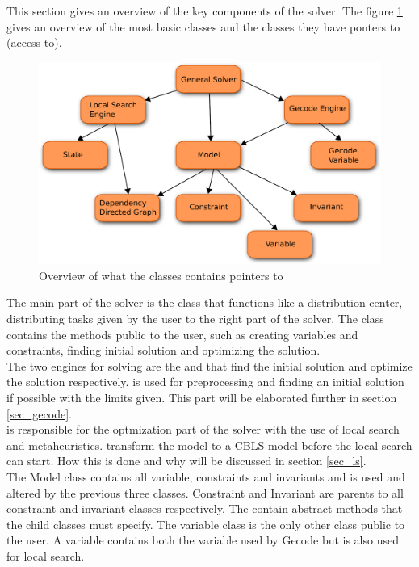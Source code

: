 This section gives an overview of the key components of the solver. The figure \ref{fig_architec} gives an overview 
of the most basic classes and the classes they have ponters to (access to). \\
\begin{figure}[!b]
\includegraphics[width=\linewidth]{architectureTest}\caption{Overview of what the classes contains pointers to} 
\label{fig_architec}
\end{figure}
The main part of the solver is the \gensol class that functions like a distribution center, distributing tasks given 
by the user to the right part of the solver. The \gensol class contains 
the methods public to the user, such as creating variables and constraints, finding initial solution and optimizing the 
solution. \\ 
The two engines for solving are the \gecodesol and \lssol that find the initial solution and optimize the solution 
respectively. \gecodesol is used for preprocessing and finding an initial solution if possible with the limits given. 
This part will be elaborated further in section \ref{sec_gecode}. \\
\lssol is responsible for the optmization part of the solver with the use of local search and metaheuristics. \lssol 
transform the model to a CBLS model before the local search can start. How this is done and why will be discussed in 
section \ref{sec_ls}. \\ 
The Model class contains all variable, constraints and invariants and is used and altered by the previous three 
classes. Constraint and Invariant are parents to all constraint and invariant classes respectively. The contain 
abstract methods that the child classes must specify. The variable class is the only other class public to the user. A 
variable contains both the variable used by Gecode but is also used for local search. 
